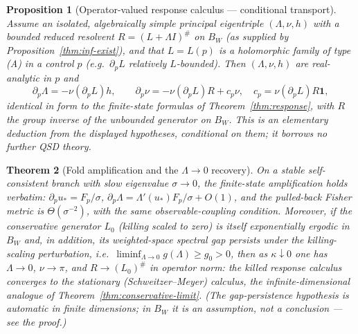 \documentclass[11pt,reqno]{amsart}
\theoremstyle{plain}
\newtheorem{theorem}{Theorem}[section]
\newtheorem{proposition}[theorem]{Proposition}
\theoremstyle{definition}
\theoremstyle{remark}
\begin{document}
\begin{proposition}[Operator-valued response calculus --- conditional transport]\label{thm:inf-response}
\emph{Assume} an isolated, algebraically simple principal eigentriple $(\Lambda,\nu,h)$
with a bounded reduced resolvent $R=(L+\Lambda I)^{\#}$ on $B_W$ (as supplied by
Proposition~\ref{thm:inf-exist}), and that $L=L(p)$ is a holomorphic family of type
\textup{(A)} in a control $p$ (e.g.\ $\partial_pL$ relatively $L$-bounded). Then
$(\Lambda,\nu,h)$ are real-analytic in $p$ and
\[
\partial_p\Lambda=-\nu(\partial_pL)h,\qquad
\partial_p\nu=-\nu(\partial_pL)R+c_p\nu,\quad c_p=\nu(\partial_pL)R\mathbf 1,
\]
identical in form to the finite-state formulas of Theorem~\ref{thm:response}, with $R$
the group inverse of the unbounded generator on $B_W$. This is an elementary deduction
from the displayed hypotheses, conditional on them; it borrows no further QSD theory.
\end{proposition}

\begin{theorem}[Fold amplification and the $\Lambda\to0$ recovery]\label{thm:inf-fold}
On a stable self-consistent branch with slow eigenvalue $\sigma\to0$, the
finite-state amplification holds verbatim: $\partial_pu_*=F_p/\sigma$,
$\partial_p\Lambda=\Lambda'(u_*)F_p/\sigma+O(1)$, and the pulled-back Fisher metric
is $\Theta(\sigma^{-2})$, with the same observable-coupling condition. Moreover, if
the conservative generator $L_0$ (killing scaled to zero) is itself exponentially
ergodic in $B_W$ \emph{and, in addition, its weighted-space spectral gap persists under
the killing-scaling perturbation}, i.e.\ $\liminf_{\Lambda\to0}g(\Lambda)\ge g_0>0$, then as
$\kappa\downarrow0$ one has $\Lambda\to0$, $\nu\to\pi$, and
$R\to(L_0)^{\#}$ in operator norm:
the killed response calculus converges to the stationary
\textup{(}Schweitzer--Meyer\textup{)} calculus, the infinite-dimensional analogue of
Theorem~\ref{thm:conservative-limit}. (The gap-persistence hypothesis is automatic in finite
dimensions; in $B_W$ it is an assumption, not a conclusion --- see the proof.)
\end{theorem}
\end{document}
